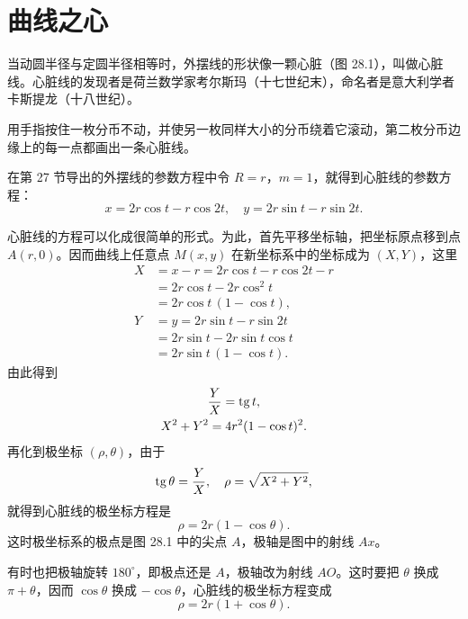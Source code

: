 \section{曲线之心}

当动圆半径与定圆半径相等时，外摆线的形状像一颗心脏（图 28.1），叫做心脏线。心脏线的发现者是荷兰数学家考尔斯玛（十七世纪末），命名者是意大利学者卡斯提龙（十八世纪）。

用手指按住一枚分币不动，并使另一枚同样大小的分币绕着它滚动，第二枚分币边缘上的每一点都画出一条心脏线。

在第 27 节导出的外摆线的参数方程中令 $R=r$，$m=1$，就得到心脏线的参数方程：
\[
  x = 2r\cos t - r\cos 2t,\quad y = 2r\sin t - r\sin 2t.
\]

心脏线的方程可以化成很简单的形式。为此，首先平移坐标轴，把坐标原点移到点 $A(r, 0)$。因而曲线上任意点 $M(x, y)$ 在新坐标系中的坐标成为 $(X, Y)$，这里
\begin{align*}
  X &= x - r = 2r\cos t - r\cos 2t - r \\
    &= 2r\cos t - 2r\cos^2 t \\
    &= 2r\cos t\,(1-\cos t), \\
  Y &= y = 2r\sin t - r\sin 2t \\
    &= 2r\sin t - 2r\sin t\cos t \\
    &= 2r\sin t\,(1-\cos t).
\end{align*}
由此得到
\begin{gather*}
  \frac{Y}{X} = \operatorname{tg} t, \\
  X^2 + Y^2 = 4r^2(1-\cos t)^2.
\end{gather*}
再化到极坐标 $(\rho, \theta)$，由于
\[
  \operatorname{tg}\theta = \frac{Y}{X},\quad \rho = \sqrt{X^2+Y^2},
\]
就得到心脏线的极坐标方程是
\[
  \rho = 2r(1-\cos\theta).
\]
这时极坐标系的极点是图 28.1 中的尖点 $A$，极轴是图中的射线 $Ax$。

有时也把极轴旋转 $180^\circ$，即极点还是 $A$，极轴改为射线 $AO$。这时要把 $\theta$ 换成 $\pi+\theta$，因而 $\cos\theta$ 换成 $-\cos\theta$，心脏线的极坐标方程变成
\[
  \rho = 2r(1+\cos\theta).
\]

